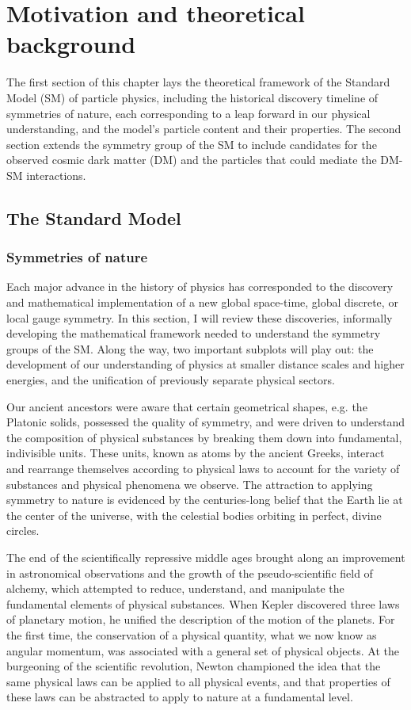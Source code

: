 \chapter{Motivation and theoretical background}

The first section of this chapter lays the theoretical framework of the Standard Model (SM) of particle physics, including the historical discovery timeline of symmetries of nature, each corresponding to a leap forward in our physical understanding, and the model's particle content and their properties. The second section extends the symmetry group of the SM to include candidates for the observed cosmic dark matter (DM) and the particles that could mediate the DM-SM interactions.

\section{The Standard Model}

\subsection{Symmetries of nature}

Each major advance in the history of physics has corresponded to the discovery and mathematical implementation of a new global space-time, global discrete, or local gauge symmetry. In this section, I will review these discoveries, informally developing the mathematical framework needed to understand the symmetry groups of the SM. Along the way, two important subplots will play out: the development of our understanding of physics at smaller distance scales and higher energies, and the unification of previously separate physical sectors.

\indent Our ancient ancestors were aware that certain geometrical shapes, e.g. the Platonic solids, possessed the quality of symmetry, and were driven to understand the composition of physical substances by breaking them down into fundamental, indivisible units. These units, known as atoms by the ancient Greeks, interact and rearrange themselves according to physical laws to account for the variety of substances and physical phenomena we observe. The attraction to applying symmetry to nature is evidenced by the centuries-long belief that the Earth lie at the center of the universe, with the celestial bodies orbiting in perfect, divine circles.

\indent The end of the scientifically repressive middle ages brought along an improvement in astronomical observations and the growth of the pseudo-scientific field of alchemy, which attempted to reduce, understand, and manipulate the fundamental elements of physical substances. When Kepler discovered three laws of planetary motion, he unified the description of the motion of the planets. For the first time, the conservation of a physical quantity, what we now know as angular momentum, was associated with a general set of physical objects. At the burgeoning of the scientific revolution, Newton championed the idea that the same physical laws can be applied to all physical events, and that properties of these laws can be abstracted to apply to nature at a fundamental level.

